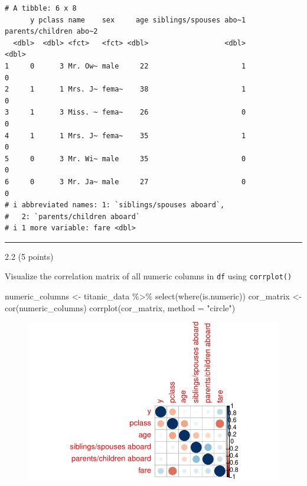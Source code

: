 \documentclass[
  letterpaper,
  DIV=11,
  numbers=noendperiod]{scrartcl}
\newenvironment{Shaded}{\begin{snugshade}}{\end{snugshade}}
\newcommand{\AttributeTok}[1]{\textcolor[rgb]{0.40,0.45,0.13}{#1}}
\newcommand{\FunctionTok}[1]{\textcolor[rgb]{0.28,0.35,0.67}{#1}}
\newcommand{\NormalTok}[1]{\textcolor[rgb]{0.00,0.23,0.31}{#1}}
\newcommand{\OtherTok}[1]{\textcolor[rgb]{0.00,0.23,0.31}{#1}}
\newcommand{\SpecialCharTok}[1]{\textcolor[rgb]{0.37,0.37,0.37}{#1}}
\newcommand{\StringTok}[1]{\textcolor[rgb]{0.13,0.47,0.30}{#1}}
\begin{document}
\begin{verbatim}
# A tibble: 6 x 8
      y pclass name    sex     age siblings/spouses abo~1 parents/children abo~2
  <dbl>  <dbl> <fct>   <fct> <dbl>                  <dbl>                  <dbl>
1     0      3 Mr. Ow~ male     22                      1                      0
2     1      1 Mrs. J~ fema~    38                      1                      0
3     1      3 Miss. ~ fema~    26                      0                      0
4     1      1 Mrs. J~ fema~    35                      1                      0
5     0      3 Mr. Wi~ male     35                      0                      0
6     0      3 Mr. Ja~ male     27                      0                      0
# i abbreviated names: 1: `siblings/spouses aboard`,
#   2: `parents/children aboard`
# i 1 more variable: fare <dbl>
\end{verbatim}

\begin{center}\rule{0.5\linewidth}{0.5pt}\end{center}

2.2 (5 points)

Visualize the correlation matrix of all numeric columns in \texttt{df}
using \texttt{corrplot()}

\begin{Shaded}
\begin{Highlighting}[]
\NormalTok{numeric\_columns }\OtherTok{\textless{}{-}}\NormalTok{ titanic\_data }\SpecialCharTok{\%\textgreater{}\%} \FunctionTok{select}\NormalTok{(}\FunctionTok{where}\NormalTok{(is.numeric))}
\NormalTok{cor\_matrix }\OtherTok{\textless{}{-}} \FunctionTok{cor}\NormalTok{(numeric\_columns)}
\FunctionTok{corrplot}\NormalTok{(cor\_matrix, }\AttributeTok{method =} \StringTok{"circle"}\NormalTok{)}
\end{Highlighting}
\end{Shaded}

\begin{figure}[H]

{\centering \includegraphics{hm4_files/figure-pdf/unnamed-chunk-11-1.pdf}

}

\end{figure}
\end{document}
